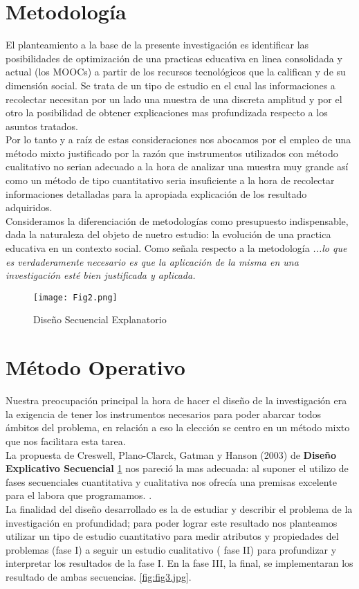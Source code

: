 \documentclass[10pt]{article}
\begin{document}
\begin{description}
\section{Metodología}
El planteamiento a la base de la presente investigación es identificar las posibilidades de optimización de una practicas educativa en linea consolidada y actual (los MOOCs) a partir de los recursos tecnológicos que la califican y de su dimensión social. Se trata de un tipo de estudio en el cual las informaciones a recolectar necesitan por un lado una muestra de una discreta amplitud y por el otro la posibilidad de obtener explicaciones mas profundizada respecto a los asuntos tratados.
\\Por lo tanto y a raíz de estas consideraciones nos abocamos por el empleo de una método mixto justificado por la razón que instrumentos utilizados con método cualitativo no serian adecuado a la hora de analizar una muestra muy grande así como un método de tipo cuantitativo seria insuficiente a la hora de recolectar informaciones detalladas para la apropiada explicación de los resultado adquiridos\citep{Cpc11}.
\\Consideramos la diferenciación de metodologías como presupuesto indispensable, dada la naturaleza del objeto de nuetro estudio: la evolución de una practica educativa en un contexto social. Como señala \citep{CaberoAlmenara2016} respecto a la metodología \textit{...lo que es verdaderamente necesario es que la aplicación de la misma en una investigación esté bien justificada y aplicada.}
\vspace{10pt}

 \begin{figure}[ht]\centering
\texttt{[image: Fig2.png]}
\caption{Diseño Secuencial Explanatorio}
\label{fig:fig.png}
\end{figure}
\section{Método Operativo}

Nuestra preocupación principal la hora de hacer el diseño de la investigación era la exigencia de tener los instrumentos necesarios para poder abarcar todos ámbitos del problema, en relación a eso la elección se centro en un método mixto que nos facilitara esta tarea.
\\La propuesta de Creswell, Plano-Clarck, Gatman y Hanson (2003) de \textbf{Diseño Explicativo Secuencial} \ref{fig:fig.png} nos pareció la mas adecuada: al suponer el utilizo de fases secuenciales cuantitativa y cualitativa nos ofrecía una premisas excelente para el labora que programamos.   \citep{Ivankova2006}. 
\\La finalidad del diseño desarrollado es la de estudiar y describir el problema de la investigación en profundidad; para poder lograr este resultado nos planteamos utilizar un tipo de estudio cuantitativo para medir atributos y propiedades del problemas (fase I) a seguir un estudio cualitativo ( fase II) para profundizar y interpretar los resultados de la fase I. En la fase III, la final, se implementaran los resultado de ambas secuencias. \ref{fig:fig3.jpg}.


\end{description}
\end{document}
